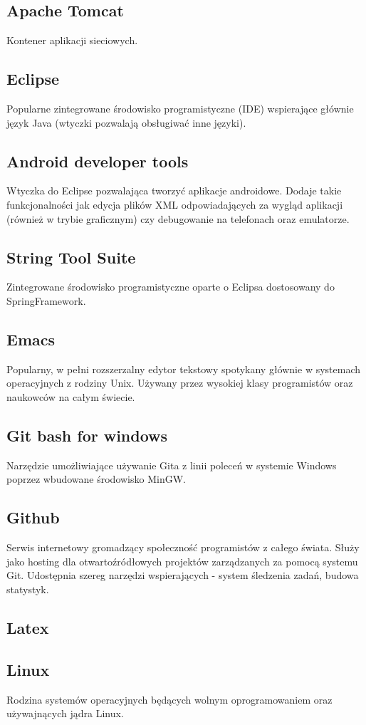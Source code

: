 \documentclass[11pt,a4paper,polish,thesis]{dcsbook}
\begin{document}
\subsection{Apache Tomcat}
Kontener aplikacji sieciowych.
\subsection{Eclipse}
Popularne zintegrowane środowisko programistyczne (IDE) wspierające głównie język Java (wtyczki pozwalają obsługiwać inne języki). 
\subsection{Android developer tools}
Wtyczka do Eclipse pozwalająca tworzyć aplikacje androidowe. Dodaje takie funkcjonalności jak edycja plików XML odpowiadających za wygląd aplikacji (również w trybie graficznym) czy debugowanie na telefonach oraz emulatorze.
\subsection{String Tool Suite}
Zintegrowane środowisko programistyczne oparte o Eclipsa dostosowany do SpringFramework.
\subsection{Emacs}
Popularny, w pełni rozszerzalny edytor tekstowy spotykany głównie w systemach operacyjnych z rodziny Unix. Używany przez wysokiej klasy programistów oraz naukowców na całym świecie.
\subsection{Git bash for windows}
Narzędzie umożliwiające używanie Gita z linii poleceń w systemie Windows poprzez wbudowane środowisko MinGW.
\subsection{Github}
Serwis internetowy gromadzący społeczność programistów z całego świata. Służy jako hosting dla otwartoźródłowych projektów zarządzanych za pomocą systemu Git.
Udostępnia szereg narzędzi wspierających - system śledzenia zadań, budowa statystyk.
\subsection{Latex}

\subsection{Linux}
Rodzina systemów operacyjnych będących wolnym oprogramowaniem oraz używajnących jądra Linux.
\end{document}
